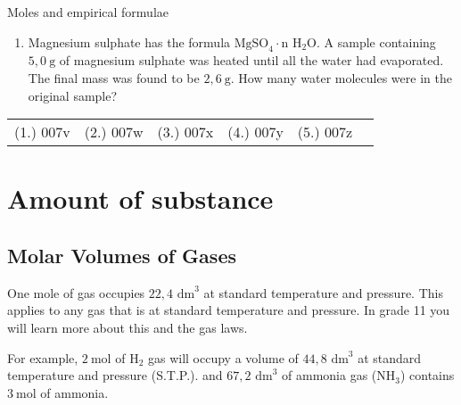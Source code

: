 \begin{exercises}{Moles and empirical formulae
      }
\begin{enumerate}[noitemsep, label=\textbf{\arabic*}. ]
\item Magnesium sulphate has the formula $\text{MgSO}_{4} \cdot \text{n H}_{2}\text{O}$. A sample containing $5,0 ~\text{g}$ of magnesium sulphate was heated until all the water had evaporated. The final mass was found to be $2,6~\text{g}$. How many water molecules were in the original sample?
\end{enumerate}
\practiceinfo
\par 
 \par \begin{tabular}[h]{cccccc}
 (1.) 007v  &  (2.) 007w  &  (3.) 007x  &  (4.) 007y  & (5.) 007z \end{tabular}
\end{exercises}
\section{Amount of substance}
            \subsection*{Molar Volumes of Gases}
            \nopagebreak
            \par
            \label{m38712*eip-id1168064596799}
  {One mole of gas occupies $22,4{\text{ dm}}^{3}$ at standard temperature and pressure. } 
      \label{m38712*id282112}This applies to any gas that is at standard temperature and pressure. In grade 11 you will learn more about this and the gas laws.\par 
For example, $2~\text{mol}$ of $\text{H}_2$ gas will occupy a volume of $44,8{\text{ dm}}^{3}$ at standard temperature and pressure (S.T.P.). and $67,2{\text{ dm}}^{3}$ of ammonia gas ($\text{NH}_3$) contains $3~\text{mol}$ of ammonia.
    \label{m38712*cid8}
